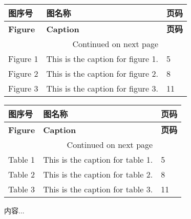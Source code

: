 \documentclass[a4paper,12pt]{lntu-thesis}
\begin{document}
\begin{Figurelist}
	\begin{longtable}{|p{3cm}|p{10cm}|p{3cm}|}
		\hline
		\textbf{图序号} & \textbf{图名称}&\textbf{页码} \\ \hline
		\endfirsthead
		\hline
		\textbf{Figure} & \textbf{Caption}&\textbf{页码} \\ \hline
		\endhead
		\hline
		\multicolumn{2}{|r|}{{Continued on next page}} \\ \hline
		\endfoot
		\hline
		\endlastfoot
		Figure 1 & This is the caption for figure 1.&5 \\ \hline
		Figure 2 & This is the caption for figure 2.&8 \\ \hline
		Figure 3 & This is the caption for figure 3.&11 \\ \hline
	\end{longtable}
\end{Figurelist}
\begin{Tablelist}
		\begin{longtable}{|p{3cm}|p{10cm}|p{3cm}|}
		\hline
		\textbf{图序号} & \textbf{图名称}&\textbf{页码} \\ \hline
		\endfirsthead
		\hline
		\textbf{Figure} & \textbf{Caption}&\textbf{页码} \\ \hline
		\endhead
		\hline
		\multicolumn{2}{|r|}{{Continued on next page}} \\ \hline
		\endfoot
		\hline
		\endlastfoot
		Table 1 & This is the caption for table 1.&5 \\ \hline
		Table 2 & This is the caption for table 2.&8 \\ \hline
		Table 3 & This is the caption for table 3.&11 \\ \hline
	\end{longtable}
\end{Tablelist}
\begin{variablecomment}
	内容...
\end{variablecomment}
%
%
%
%
\end{document}
